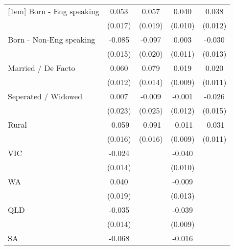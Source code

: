 {\begin{tabular}{l*{4}{c}}
[1em]
Born - Eng speaking &       0.053\sym{**} &       0.057\sym{**} &       0.040\sym{***}&       0.038\sym{**} \\
                    &     (0.017)         &     (0.019)         &     (0.010)         &     (0.012)         \\
[1em]
Born - Non-Eng speaking&      -0.085\sym{***}&      -0.097\sym{***}&       0.003         &      -0.030\sym{*}  \\
                    &     (0.015)         &     (0.020)         &     (0.011)         &     (0.013)         \\
[1em]
Married / De Facto  &       0.060\sym{***}&       0.079\sym{***}&       0.019\sym{*}  &       0.020         \\
                    &     (0.012)         &     (0.014)         &     (0.009)         &     (0.011)         \\
[1em]
Seperated / Widowed &       0.007         &      -0.009         &      -0.001         &      -0.026         \\
                    &     (0.023)         &     (0.025)         &     (0.012)         &     (0.015)         \\
[1em]
Rural               &      -0.059\sym{***}&      -0.091\sym{***}&      -0.011         &      -0.031\sym{**} \\
                    &     (0.016)         &     (0.016)         &     (0.009)         &     (0.011)         \\
[1em]
VIC                 &      -0.024         &                     &      -0.040\sym{***}&                     \\
                    &     (0.014)         &                     &     (0.010)         &                     \\
[1em]
WA                  &       0.040\sym{*}  &                     &      -0.009         &                     \\
                    &     (0.019)         &                     &     (0.013)         &                     \\
[1em]
QLD                 &      -0.035\sym{*}  &                     &      -0.039\sym{***}&                     \\
                    &     (0.014)         &                     &     (0.009)         &                     \\
[1em]
SA                  &      -0.068\sym{***}&                     &      -0.016         &                     \\

\end{tabular}}
